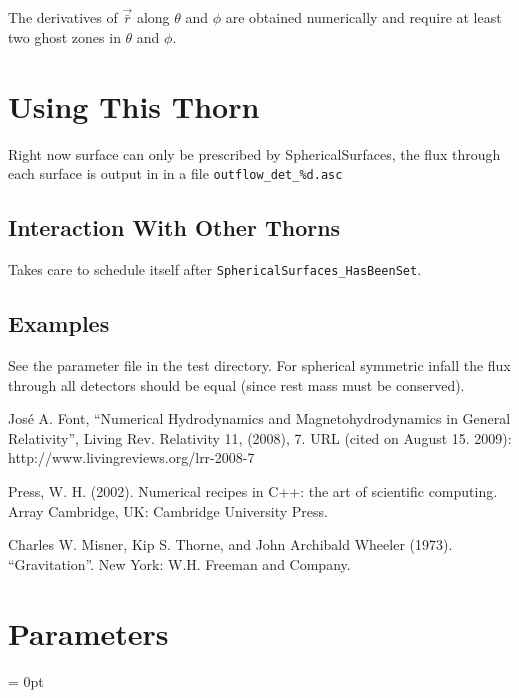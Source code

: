 The derivatives of $\vec{\bar r}$ along $\theta$ and $\phi$ are obtained
numerically and require at least two ghost zones in $\theta$ and $\phi$.

\section{Using This Thorn}
Right now surface can only be prescribed by SphericalSurfaces, the flux through
each surface is output in in a file \verb|outflow_det_%d.asc|

\subsection{Interaction With Other Thorns}
Takes care to schedule itself after \verb|SphericalSurfaces_HasBeenSet|.

\subsection{Examples}
See the parameter file in the test directory. For spherical symmetric infall
the flux through all detectors should be equal (since rest mass must be
conserved).

\begin{thebibliography}{9}
     Jos\'e A. Font,
    ``Numerical Hydrodynamics and Magnetohydrodynamics in General Relativity'',
    Living Rev. Relativity 11,  (2008),  7. URL (cited on August 15. 2009):
    http://www.livingreviews.org/lrr-2008-7

     Press, W. H. (2002). Numerical recipes in C++: the
        art of scientific computing. Array Cambridge, UK: Cambridge University
        Press. 

     Charles W. Misner, Kip S. Thorne, and John Archibald Wheeler (1973).
       ``Gravitation''. New York: W.H. Freeman and Company.
\end{thebibliography}




\section{Parameters} 


\parskip = 0pt

\setlength{\tableWidth}{160mm}

\setlength{\paraWidth}{\tableWidth}
\setlength{\descWidth}{\tableWidth}
\settowidth{\maxVarWidth}{output\_relative\_coordinates}

